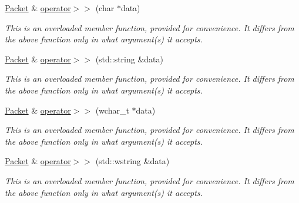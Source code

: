 \begin{DoxyCompactItemize}
\mbox{\label{classsf_1_1_packet_ae9f8d8b0c776204f79f615b1e58bccec}} 
\mbox{\hyperlink{classsf_1_1_packet}{Packet}} \& \mbox{\hyperlink{classsf_1_1_packet_ae9f8d8b0c776204f79f615b1e58bccec}{operator$>$$>$}} (char $\ast$data)
\begin{DoxyCompactList}\small\item\em This is an overloaded member function, provided for convenience. It differs from the above function only in what argument(s) it accepts. \end{DoxyCompactList}\item 
\mbox{\label{classsf_1_1_packet_aabace32063c44e1a5cc54af6267c1fab}} 
\mbox{\hyperlink{classsf_1_1_packet}{Packet}} \& \mbox{\hyperlink{classsf_1_1_packet_aabace32063c44e1a5cc54af6267c1fab}{operator$>$$>$}} (std\+::string \&data)
\begin{DoxyCompactList}\small\item\em This is an overloaded member function, provided for convenience. It differs from the above function only in what argument(s) it accepts. \end{DoxyCompactList}\item 
\mbox{\label{classsf_1_1_packet_a1444500d29df0991e630ac78933c6282}} 
\mbox{\hyperlink{classsf_1_1_packet}{Packet}} \& \mbox{\hyperlink{classsf_1_1_packet_a1444500d29df0991e630ac78933c6282}{operator$>$$>$}} (wchar\+\_\+t $\ast$data)
\begin{DoxyCompactList}\small\item\em This is an overloaded member function, provided for convenience. It differs from the above function only in what argument(s) it accepts. \end{DoxyCompactList}\item 
\mbox{\label{classsf_1_1_packet_ab74c37a290385fd7b1f962bf954a2005}} 
\mbox{\hyperlink{classsf_1_1_packet}{Packet}} \& \mbox{\hyperlink{classsf_1_1_packet_ab74c37a290385fd7b1f962bf954a2005}{operator$>$$>$}} (std\+::wstring \&data)
\begin{DoxyCompactList}\small\item\em This is an overloaded member function, provided for convenience. It differs from the above function only in what argument(s) it accepts. \end{DoxyCompactList}\item 

\end{DoxyCompactItemize}
